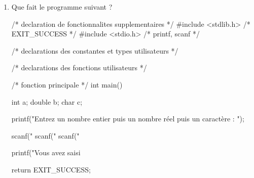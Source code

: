 \begin{enumerate}
\item Que fait le programme suivant ?
\begin{small}
\begin{listing}{1}
/* declaration de fonctionnalites supplementaires */
#include <stdlib.h> /* EXIT_SUCCESS */
#include <stdio.h> /* printf, scanf */

/* declarations des constantes et types utilisateurs */

/* declarations des fonctions utilisateurs */

/* fonction principale */
int main()
{
    int a;
    double b;
    char c;

    printf("Entrez un nombre entier puis un nombre réel puis un caractère : ");

    scanf("%
    scanf("%
    scanf(" %

    printf("Vous avez saisi %

    return EXIT_SUCCESS;
}


\end{listing}
\end{small}
\end{enumerate}
